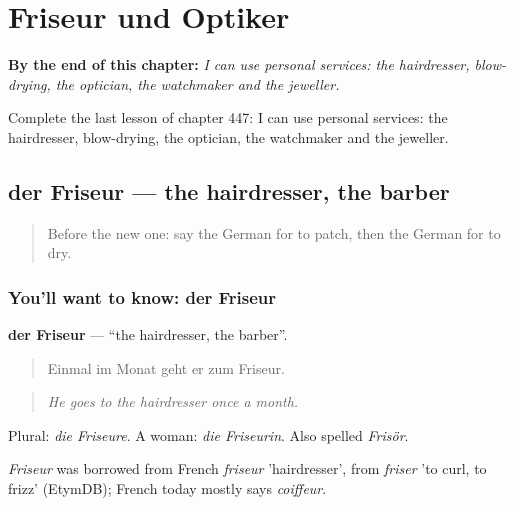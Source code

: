 
\chapter{Friseur und Optiker}
\label{ch:ge-friseur-und-optiker}

\begin{chapteropening}
\textbf{By the end of this chapter:} \emph{I can use personal services: the hairdresser, blow-drying, the optician, the watchmaker and the jeweller.}

Complete the last lesson of chapter 447: I can use personal services: the hairdresser, blow-drying, the optician, the watchmaker and the jeweller.
\end{chapteropening}

\section[der Friseur]{der Friseur — the hairdresser, the barber}

\label{lesson:GE-C447-friseur}



\begin{quote}
Before the new one: say the German for to patch, then the German for to dry.
\end{quote}

\subsection*{You'll want to know: der Friseur}
\textbf{der Friseur} — \textquotedblleft{}the hairdresser, the barber\textquotedblright{}.

\begin{quote}
Einmal im Monat geht er zum Friseur.
\end{quote}

\begin{quote}
\emph{He goes to the hairdresser once a month.}
\end{quote}

Plural: \emph{die Friseure}. A woman: \emph{die Friseurin}. Also spelled \emph{Frisör}.

\begin{cousinweb}
\emph{Friseur} was borrowed from French \emph{friseur} 'hairdresser', from \emph{friser} 'to curl, to frizz' (EtymDB); French today mostly says \emph{coiffeur}.
\end{cousinweb}

